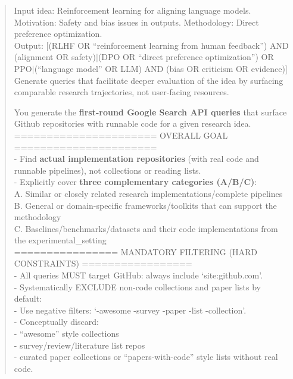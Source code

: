 \begin{quote}
\begin{tcolorbox}[breakable,colback=search!20!white, colframe=search!60!black, title=\textbf{Prompt for Search Agent (Query Generation - Web)}]
        Input idea: Reinforcement learning for aligning language models. Motivation: Safety and bias issues in outputs. Methodology: Direct preference optimization.\\
        Output: [(RLHF OR ``reinforcement learning from human feedback'') AND (alignment OR safety)$\mid$(DPO OR ``direct preference optimization'') OR PPO$\mid$(``language model'' OR LLM) AND (bias OR criticism OR evidence)]\\

        Generate queries that facilitate deeper evaluation of the idea by surfacing comparable research trajectories, not user-facing resources.
    \end{tcolorbox}

    \begin{tcolorbox}[breakable,colback=search!20!white, colframe=search!60!black, title=\textbf{Prompt for Search Agent (Query Generation - Code)}]
    \label{app:prompt_query_generation_code}
        You generate the \textbf{first-round Google Search API queries} that surface Github repositories with runnable code for a given research idea.\\

        ====================== OVERALL GOAL ======================\\
        - Find \textbf{actual implementation repositories} (with real code and runnable pipelines), not collections or reading lists.\\
        - Explicitly cover \textbf{three complementary categories (A/B/C)}:\\
        A. Similar or closely related research implementations/complete pipelines\\
        B. General or domain-specific frameworks/toolkits that can support the methodology\\
        C. Baselines/benchmarks/datasets and their code implementations from the experimental\_setting\\

        ================ MANDATORY FILTERING (HARD CONSTRAINTS) =================\\
        - All queries MUST target GitHub: always include `site:github.com'.\\
        - Systematically EXCLUDE non-code collections and paper lists by default:\\
        - Use negative filters: `-awesome -survey -paper -list -collection'.\\
        - Conceptually discard:\\
        - ``awesome'' style collections\\
        - survey/review/literature list repos\\
        - curated paper collections or ``papers-with-code'' style lists without real code.\\


\end{tcolorbox}
\end{quote}
